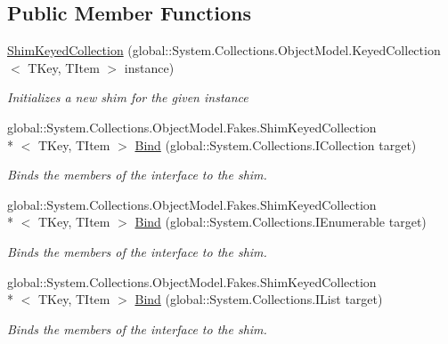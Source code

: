 \subsection*{Public Member Functions}
\begin{DoxyCompactItemize}
\item 
\hyperlink{class_system_1_1_collections_1_1_object_model_1_1_fakes_1_1_shim_keyed_collection_3_01_t_key_00_01_t_item_01_4_acd46985115bc2c3277f3c9f1c6f5c9de}{Shim\-Keyed\-Collection} (global\-::\-System.\-Collections.\-Object\-Model.\-Keyed\-Collection$<$ T\-Key, T\-Item $>$ instance)
\begin{DoxyCompactList}\small\item\em Initializes a new shim for the given instance\end{DoxyCompactList}\item 
global\-::\-System.\-Collections.\-Object\-Model.\-Fakes.\-Shim\-Keyed\-Collection\\*
$<$ T\-Key, T\-Item $>$ \hyperlink{class_system_1_1_collections_1_1_object_model_1_1_fakes_1_1_shim_keyed_collection_3_01_t_key_00_01_t_item_01_4_ad9a9de88550ab35568a402a85f401767}{Bind} (global\-::\-System.\-Collections.\-I\-Collection target)
\begin{DoxyCompactList}\small\item\em Binds the members of the interface to the shim.\end{DoxyCompactList}\item 
global\-::\-System.\-Collections.\-Object\-Model.\-Fakes.\-Shim\-Keyed\-Collection\\*
$<$ T\-Key, T\-Item $>$ \hyperlink{class_system_1_1_collections_1_1_object_model_1_1_fakes_1_1_shim_keyed_collection_3_01_t_key_00_01_t_item_01_4_a0f5377167b428686e7bc9fe814f9fd7f}{Bind} (global\-::\-System.\-Collections.\-I\-Enumerable target)
\begin{DoxyCompactList}\small\item\em Binds the members of the interface to the shim.\end{DoxyCompactList}\item 
global\-::\-System.\-Collections.\-Object\-Model.\-Fakes.\-Shim\-Keyed\-Collection\\*
$<$ T\-Key, T\-Item $>$ \hyperlink{class_system_1_1_collections_1_1_object_model_1_1_fakes_1_1_shim_keyed_collection_3_01_t_key_00_01_t_item_01_4_a761e85042ed4a917a869014a7248172a}{Bind} (global\-::\-System.\-Collections.\-I\-List target)
\begin{DoxyCompactList}\small\item\em Binds the members of the interface to the shim.\end{DoxyCompactList}\item 

\end{DoxyCompactItemize}
